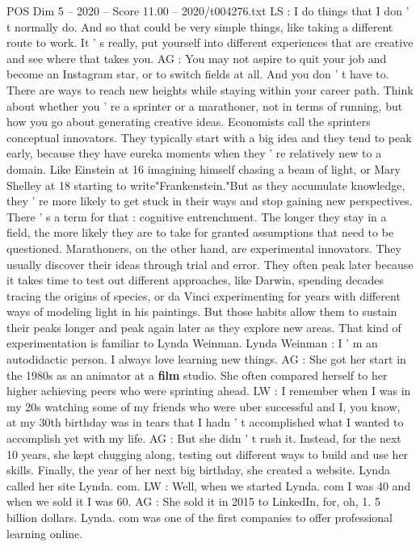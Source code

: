 \begin{textsample}{POS Dim 5 – 2020 – Score 11.00 – 2020/t004276.txt}
LS : I do things that I don ' t normally do.
And so that could be very simple things, like taking a different route to work.
It ' s really, put yourself into different experiences that are creative and see where that takes you.
AG : You may not aspire to quit your job and become an Instagram star, or to switch fields at all.
And you don ' t have to.
There are ways to reach new heights while staying within your career path.
Think about whether you ' re a sprinter or a marathoner, not in terms of running, but how you go about generating creative ideas.
Economists call the sprinters conceptual innovators.
They typically start with a big idea and they tend to peak early, because they have eureka moments when they ' re relatively new to a domain.
Like Einstein at 16 imagining himself chasing a beam of light, or Mary Shelley at 18 starting to write"Frankenstein."But as they accumulate knowledge, they ' re more likely to get stuck in their ways and stop gaining new perspectives.
There ' s a term for that : cognitive entrenchment.
The longer they stay in a field, the more likely they are to take for granted assumptions that need to be questioned.
Marathoners, on the other hand, are experimental innovators.
They usually discover their ideas through trial and error.
They often peak later because it takes time to test out different approaches, like Darwin, spending decades tracing the origins of species, or da Vinci experimenting for years with different ways of modeling light in his paintings.
But those habits allow them to sustain their peaks longer and peak again later as they explore new areas.
That kind of experimentation is familiar to Lynda Weinman.
Lynda Weinman : I ' m an autodidactic person.
I always love learning new things.
AG : She got her start in the 1980s as an animator at a \textbf{film} studio.
She often compared herself to her higher achieving peers who were sprinting ahead.
LW : I remember when I was in my 20s watching some of my friends who were uber successful and I, you know, at my 30th birthday was in tears that I hadn ' t accomplished what I wanted to accomplish yet with my life.
AG : But she didn ' t rush it.
Instead, for the next 10 years, she kept chugging along, testing out different ways to build and use her skills.
Finally, the year of her next big birthday, she created a website.
Lynda called her site Lynda. com.
LW : Well, when we started Lynda. com I was 40 and when we sold it I was 60.
AG : She sold it in 2015 to LinkedIn, for, oh, 1. 5 billion dollars.
Lynda. com was one of the first companies to offer professional learning online.

\end{textsample}
